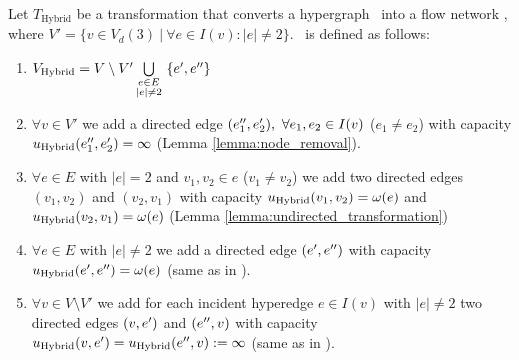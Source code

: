 \begin{definition}
Let $T_{\text{Hybrid}}$ be a transformation that converts a hypergraph \HypergraphDef~into 
a flow network \Hybrid, where $V' = \{v \in V_d(3)\ |\ \forall e \in I(v): |e| \neq 2\}$. 
\ShortHybrid~is defined as follows:
\begin{enumerate}
\item $V_{\text{Hybrid}} = V\setminus V' \bigcup\limits_{\substack{e \in E \\ |e| \neq 2}}\ \{e', e''\}$
\item $\forall v \in V'$ we add a directed edge $(e_1'', e_2'),\ \forall e_1, e_2 \in I(v)$ 
      ($e_1 \neq e_2$) with capacity $u_{\text{Hybrid}}(e_1'', e_2') = \infty$ (Lemma \ref{lemma:node_removal}).
\item $\forall e \in E$ with $|e| = 2$ and $v_1,v_2 \in e$ ($v_1 \neq v_2$) we add 
      two directed edges $(v_1,v_2)$ and $(v_2,v_1)$ with capacity $u_{\text{Hybrid}}(v_1,v_2) = \omega(e)$
      and $u_{\text{Hybrid}}(v_2,v_1) = \omega(e)$ (Lemma \ref{lemma:undirected_transformation})
\item $\forall e \in E$ with $|e| \neq 2$ we add a directed edge $(e',e'')$
      with capacity $u_{\text{Hybrid}}(e',e'') = \omega(e)$ (same as in ).
\item $\forall v \in V\setminus V'$ we add for each incident hyperedge $e \in I(v)$ with $|e| \neq 2$ 
      two directed edges $(v,e')$ and $(e'',v)$ with capacity 
      $u_{\text{Hybrid}}(v,e') = u_{\text{Hybrid}}(e'',v) := \infty$ (same as in ).
\end{enumerate} 
\end{definition}

